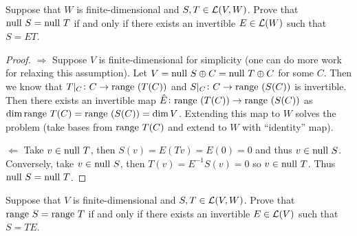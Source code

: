 \documentclass{extarticle}
\begin{document}
\begin{problem}{6}
    Suppose that \(W\) is finite-dimensional and \(S, T \in \mathcal{L}(V, W)\). Prove that 
    \(\text{null } S = \text{null } T\) if and only if there exists an invertible \(E \in \mathcal{L}(W)\) such that 
    \(S = ET\).  
\end{problem}

\begin{proof}
\(\Rightarrow\) Suppose \(V\) is finite-dimensional for simplicity (one can do more work for 
relaxing this assumption). 
 Let \(V = \text{null } S \oplus C = \text{null } T \oplus C\) for some \(C\). Then we know that 
\(T|_C \colon C \to \text{range } (T(C))\) and \(S|_C \colon C \to \text{range }(S(C))\) is invertible.  Then 
there exists an invertible map \(\hat{E} \colon \text{range }(T(C)) \to \text{range }(S(C))\) as \(\dim \text{range } T(C) 
= \text{range } (S(C)) = \dim V\). Extending this map to \(W\) solves the problem (take bases from \(\text{range } T(C)\)
and extend to \(W\) with ``identity'' map).

\(\Leftarrow\) Take \(v \in \text{null } T\), then \(S(v) = E(Tv) = E(0)  = 0\) and thus \(v \in \text{null } S\). Conversely,
take \(v \in \text{null } S\), then \(T(v) = E^{-1}S(v) = 0\) so \(v \in \text{null } T\). Thus \(\text{null } S = \text{null } T\). 
\end{proof}

\begin{problem}{7}
    Suppose that \(V\) is finite-dimensional and \(S, T \in \mathcal{L}(V, W)\). Prove that \(\text{range } S = \text{range } T\)
    if and only if there exists an invertible \(E \in \mathcal{L}(V)\) such that \(S = TE\). 
\end{problem}
\end{document}
